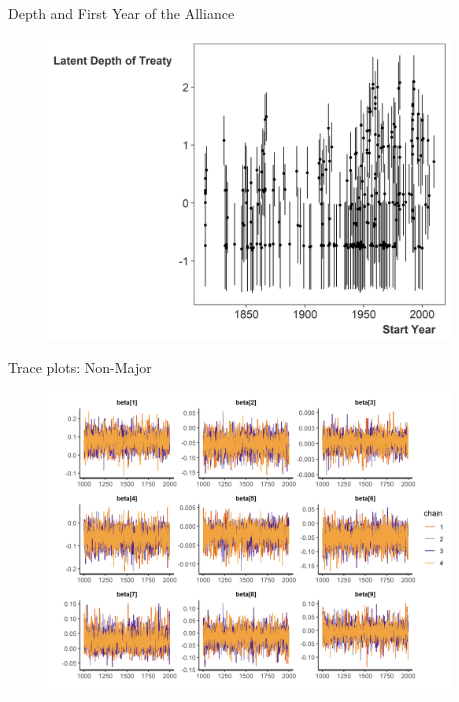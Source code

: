 \documentclass[12pt]{beamer}
\begin{document}
\begin{frame}{Depth and First Year of the Alliance}

\begin{figure}
	\centering
		\includegraphics[width=0.95\textwidth]{ld-start-year.png}
\end{figure}


\end{frame}






\begin{frame}{Trace plots: Non-Major}

\begin{figure}
	\centering
		\includegraphics[width=0.95\textwidth]{beta-trace-maj.png}
\end{figure}


\end{frame}
\end{document}
